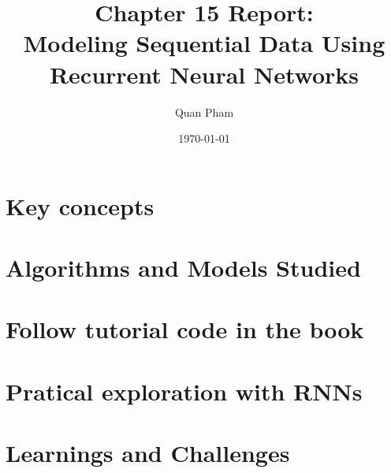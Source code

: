 \documentclass[12pt]{article}
\title{Chapter 15 Report: \\ Modeling Sequential Data Using Recurrent Neural Networks}
\author{Quan Pham}
\date{\today}
\begin{document}
\maketitle
\tableofcontents
\newpage

% 

\section{Key concepts}


\section{Algorithms and Models Studied}


\section{Follow tutorial code in the book}


\section{Pratical exploration with RNNs}


\section{Learnings and Challenges}


% 

% 
% 
\end{document}
